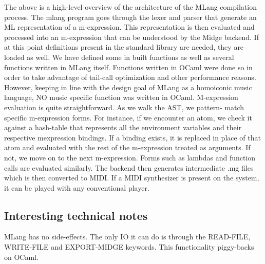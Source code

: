 \documentclass[letterpaper,11pt]{article}
\begin{document}
{        \begin{figure}[H]
            \centering
        \end{figure}
The above is a high-level overview of the architecture of the MLang compilation process. The mlang program goes through the lexer and parser that
generate an ML representation of a m-expression. This representation is then evaluated and processed into an m-expression that can be understood
by the Midge backend. If at this point definitions present in the standard library are needed, they are loaded as well.
We have defined some in built functions as well as several functions written in MLang itself. Functions written in OCaml were done so in order to
take advantage of tail-call optimization and other performance reasons. However, keeping in line with the design goal of MLang as a homoiconic
music language, NO music specific function was written in OCaml. M-expression evaluation is quite straightforward. As we walk the AST, we pattern-
match specific m-expression forms. For instance, if we encounter an atom, we check it against a hash-table that represents all the environment
variables and their respective mexpression bindings. If a binding exists, it is replaced in place of that atom and evaluated with the rest of the
m-expression treated as arguments. If not, we move on to the next m-expression. Forms such as lambdas and function calls are evaluated similarly.
The backend then generates intermediate .mg files which is then converted to MIDI. If a MIDI synthesizer is present on the system, it can be played 
with any conventional player.

\subsection{Interesting technical notes}

MLang has no side-effects. The only IO it can do is through the READ-FILE, WRITE-FILE and EXPORT-MIDGE keywords. This functionality piggy-backs on
OCaml.

}
\end{document}

